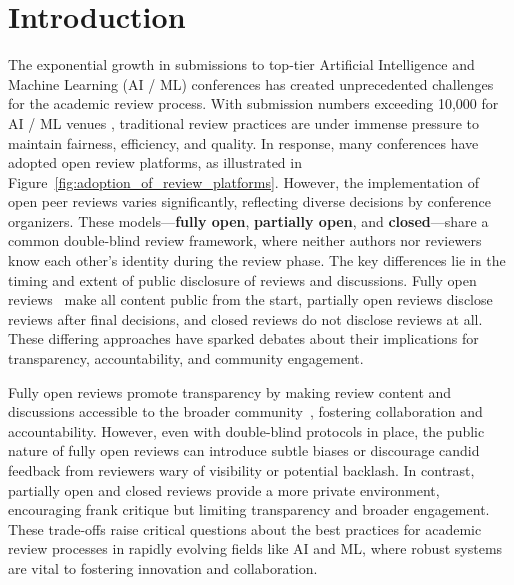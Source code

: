 \section{Introduction}


The exponential growth in submissions to top-tier Artificial Intelligence and Machine Learning (AI / ML) conferences has created unprecedented challenges for the academic review process. With submission numbers exceeding 10,000 for AI / ML venues \cite{weissburg2024position}, traditional review practices are under immense pressure to maintain fairness, efficiency, and quality. In response, many conferences have adopted open review platforms, as illustrated in Figure~\ref{fig:adoption_of_review_platforms}. However, the implementation of open peer reviews varies significantly, reflecting diverse decisions by conference organizers. These models—\textbf{fully open}, \textbf{partially open}, and \textbf{closed}—share a common double-blind review framework, where neither authors nor reviewers know each other’s identity during the review phase. The key differences lie in the timing and extent of public disclosure of reviews and discussions. Fully open reviews~\cite{ross2017open} make all content public from the start, partially open reviews disclose reviews after final decisions, and closed reviews do not disclose reviews at all. These differing approaches have sparked debates about their implications for transparency, accountability, and community engagement.

Fully open reviews promote transparency by making review content and discussions accessible to the broader community~\cite{tran2021an, cortes2021inconsistency, Lawrence2022NeurIPSExperiment, beygelzimer2023has, wang2023have}, fostering collaboration and accountability. However, even with double-blind protocols in place, the public nature of fully open reviews can introduce subtle biases or discourage candid feedback from reviewers wary of visibility or potential backlash. In contrast, partially open and closed reviews provide a more private environment, encouraging frank critique but limiting transparency and broader engagement. These trade-offs raise critical questions about the best practices for academic review processes in rapidly evolving fields like AI and ML, where robust systems are vital to fostering innovation and collaboration.


